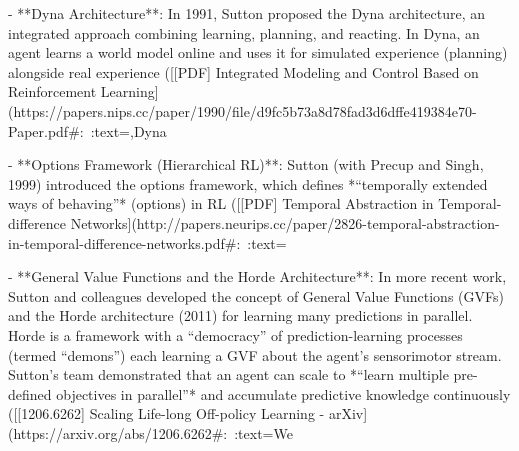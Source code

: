 - **Dyna Architecture**: In 1991, Sutton proposed the Dyna architecture, an integrated approach combining learning, planning, and reacting. In Dyna, an agent learns a world model online and uses it for simulated experience (planning) alongside real experience ([[PDF] Integrated Modeling and Control Based on Reinforcement Learning](https://papers.nips.cc/paper/1990/file/d9fc5b73a8d78fad3d6dffe419384e70-Paper.pdf#:~:text=,Dyna%

- **Options Framework (Hierarchical RL)**: Sutton (with Precup and Singh, 1999) introduced the options framework, which defines *“temporally extended ways of behaving”* (options) in RL ([[PDF] Temporal Abstraction in Temporal-difference Networks](http://papers.neurips.cc/paper/2826-temporal-abstraction-in-temporal-difference-networks.pdf#:~:text=%

- **General Value Functions and the Horde Architecture**: In more recent work, Sutton and colleagues developed the concept of General Value Functions (GVFs) and the Horde architecture (2011) for learning many predictions in parallel. Horde is a framework with a “democracy” of prediction-learning processes (termed “demons”) each learning a GVF about the agent’s sensorimotor stream. Sutton’s team demonstrated that an agent can scale to *“learn multiple pre-defined objectives in parallel”* and accumulate predictive knowledge continuously ([[1206.6262] Scaling Life-long Off-policy Learning - arXiv](https://arxiv.org/abs/1206.6262#:~:text=We%

